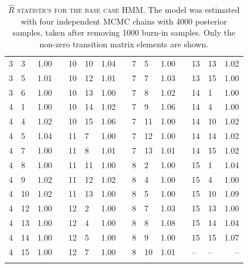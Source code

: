 \begin{xltabular}{0.9\linewidth}{llrp{0.2cm}llrp{0.2cm}llrp{0.2cm}llr}
    3 & 3 & 1.00  & &  10 & 10 & 1.04 & & 7 & 5 & 1.00 & &  13 & 13 & 1.02 \\
    3 & 5 & 1.01  & &  10 & 12 & 1.01 & & 7 & 7 & 1.03 & &  13 & 15 & 1.00 \\
    3 & 6 & 1.00  & &  10 & 13 & 1.00 & & 7 & 8 & 1.02 & &  14 & 1 & 1.00 \\
    4 & 1 & 1.00  & &  10 & 14 & 1.02 & & 7 & 9 & 1.06 & &  14 & 4 & 1.00 \\
    4 & 4 & 1.02  & &  10 & 15 & 1.06 & & 7 & 11 & 1.00 & & 14 & 10 & 1.02 \\
    4 & 5 & 1.04  & &  11 & 7 & 1.00 & & 7 & 12 & 1.00 & & 14 & 14 & 1.02 \\
    4 & 7 & 1.00  & &  11 & 8 & 1.01 & & 7 & 13 & 1.01 & & 14 & 15 & 1.02 \\
    4 & 8 & 1.00  & &  11 & 11 & 1.00 & & 8 & 2 & 1.00 & & 15 & 1 & 1.04 \\
    4 & 9 & 1.02  & &  11 & 12 & 1.02 & & 8 & 4 & 1.00 & & 15 & 4 & 1.00 \\
    4 & 10 & 1.02 &  &  11 & 13 & 1.00 & & 8 & 5 & 1.00 & & 15 & 10 & 1.09 \\
    4 & 12 & 1.00 &  &  12 & 2 & 1.00 & & 8 & 7 & 1.03 & & 15 & 13 & 1.00 \\
    4 & 13 & 1.00 &  &  12 & 4 & 1.00 & & 8 & 8 & 1.08 & & 15 & 14 & 1.04 \\
    4 & 14 & 1.00 &  &  12 & 5 & 1.00 & & 8 & 9 & 1.00 & & 15 & 15 & 1.07 \\
    4 & 15 & 1.00 &  &  12 & 7 & 1.00 & & 8 & 10 & 1.01 & & -- & -- &  -- \\
    \bottomrule
    \caption[Convergence statistics for the base case HMM]{\textsc{$\hat{R}$ statistics for the base case HMM}. The model was estimated with four independent MCMC chains with \num{4000} posterior samples, taken after removing \num{1000} burn-in samples. Only the non-zero transition matrix elements are shown.}\label{tab:aadh_base_case_rhat} 
\end{xltabular}

